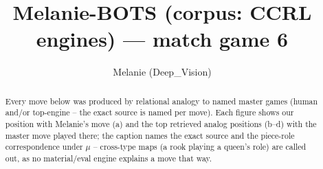 \documentclass[11pt]{article}
\title{Melanie-BOTS (corpus: CCRL engines) — match game 6}
\author{Melanie (Deep\_Vision)}
\date{}
\begin{document}
\maketitle

\begin{abstract}Every move below was produced by relational analogy to named master games (human and/or top-engine -- the exact source is named per move). Each figure shows our position with Melanie's move (a) and the top retrieved analog positions (b--d) with the master move played there; the caption names the exact source and the piece-role correspondence under $\mu$ -- cross-type maps (a rook playing a queen's role) are called out, as no material/eval engine explains a move that way.\end{abstract}

\begin{figure}[p]\centering
\begin{subfigure}{0.46\textwidth}\centering
\resizebox{\linewidth}{!}{%
\newchessgame
\chessboard[
  setfen={r1bq1rk1/pppp1ppp/3n1b2/4R3/3P4/8/PPP2PPP/RNBQ1BK1 w - - 1 10},
  showmover=false,
  pgfstyle=straightmove, color=movearrow, markmove={e5-e1}
]}
\caption{}
\end{subfigure}\hfill
\begin{subfigure}{0.46\textwidth}\centering
\resizebox{\linewidth}{!}{%
\newchessgame
\chessboard[
  setfen={r1bqnrk1/pppp1ppp/5b2/4R3/2PP4/8/PP3PPP/RNBQ1BK1 w - - 1 11},
  showmover=false,
  pgfstyle=straightmove, color=movearrow, markmove={e5-e1}
]}
\caption{}
\end{subfigure}
\\[4pt]
\begin{subfigure}{0.46\textwidth}\centering
\resizebox{\linewidth}{!}{%
\newchessgame
\chessboard[
  setfen={r1bq1rk1/pppp1ppp/3n1b2/4R3/3P4/8/PPP2PPP/RNBQ1BK1 w - - 1 10},
  showmover=false,
  pgfstyle=straightmove, color=movearrow, markmove={e5-e1}
]}
\caption{}
\end{subfigure}\hfill
\begin{subfigure}{0.46\textwidth}\centering
\resizebox{\linewidth}{!}{%
\newchessgame
\chessboard[
  setfen={r1bq1rk1/pppp1ppp/3n1b2/4R3/3P4/8/PPP2PPP/RNBQ1BK1 w - - 1 10},
  showmover=false,
  pgfstyle=straightmove, color=movearrow, markmove={e5-e1}
]}
\caption{}
\end{subfigure}

\end{figure}
\end{document}
